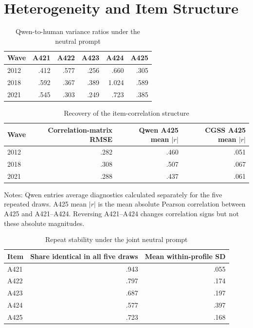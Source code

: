 \documentclass[11pt]{article}
\begin{document}
\section{Heterogeneity and Item Structure}

\begin{table}[!htbp]
\centering
\caption{Qwen-to-human variance ratios under the neutral prompt}
\label{tab:s3-variance}
\small
\begin{tabular}{lrrrrr}
\toprule
Wave & A421 & A422 & A423 & A424 & A425 \\
\midrule
2012 & .412 & .577 & .256 & .660 & .305 \\
2018 & .592 & .367 & .389 & 1.024 & .589 \\
2021 & .545 & .303 & .249 & .723 & .385 \\
\bottomrule
\end{tabular}
\end{table}

\begin{table}[!htbp]
\centering
\caption{Recovery of the item-correlation structure}
\label{tab:s4-correlations}
\begin{threeparttable}
\small
\begin{tabular}{lrrr}
\toprule
Wave & Correlation-matrix RMSE & Qwen A425 mean $|r|$ & CGSS A425 mean $|r|$ \\
\midrule
2012 & .282 & .460 & .051 \\
2018 & .308 & .507 & .067 \\
2021 & .288 & .437 & .061 \\
\bottomrule
\end{tabular}
\begin{tablenotes}[flushleft]
\footnotesize
\item Notes: Qwen entries average diagnostics calculated separately for the five repeated draws.
A425 mean $|r|$ is the mean absolute Pearson correlation between A425 and A421--A424. Reversing
A421--A424 changes correlation signs but not these absolute magnitudes.
\end{tablenotes}
\end{threeparttable}
\end{table}

\begin{table}[!htbp]
\centering
\caption{Repeat stability under the joint neutral prompt}
\label{tab:s4b-repeat}
\small
\begin{tabular}{lrr}
\toprule
Item & Share identical in all five draws & Mean within-profile SD \\
\midrule
A421 & .943 & .055 \\
A422 & .797 & .174 \\
A423 & .687 & .197 \\
A424 & .577 & .397 \\
A425 & .723 & .168 \\
\bottomrule
\end{tabular}
\end{table}
\end{document}
